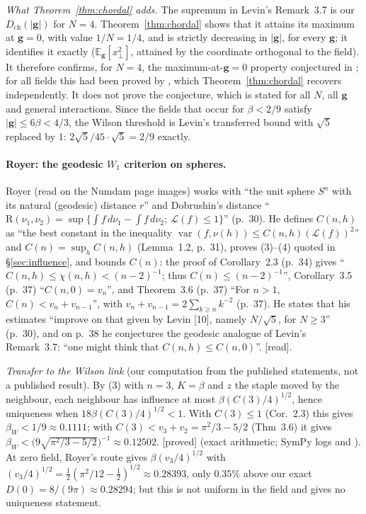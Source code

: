 \documentclass[11pt,a4paper]{article}
\theoremstyle{remark}
\theoremstyle{definition}
\theoremstyle{plain}
\theoremstyle{remark}
\newcommand{\E}{\mathbb{E}}
\newcommand{\st}[1]{\textsf{[#1]}}
\newcommand{\Dch}{D_{\mathrm{ch}}}
\begin{document}
\emph{What Theorem~\ref{thm:chordal} adds.} The supremum in Levin's Remark~3.7 is our $\Dch(|\mathbf g|)$ for $N=4$.
Theorem~\ref{thm:chordal} shows that it attains its maximum at $\mathbf g=0$, with value $1/N=1/4$, and is strictly decreasing in $|\mathbf g|$, for every $\mathbf g$; it identifies it exactly
($\E_{\mathbf g}[x_\perp^2]$, attained by the coordinate orthogonal to the field). It therefore confirms, for $N=4$, the
maximum-at-$\mathbf g=0$ property conjectured in \cite[Rem.~3.7]{Lev80}; for all fields this had been proved by \cite[Theorem~7]{BB26}, which Theorem~\ref{thm:chordal} recovers independently.
It does not prove the conjecture, which is stated for all $N$, all $\mathbf g$ and general interactions.
Since the fields that occur for $\beta<2/9$ satisfy $|\mathbf g|\le6\beta<4/3$, the Wilson threshold is
Levin's transferred bound with $\sqrt5$ replaced by $1$: $2\sqrt5/45\cdot\sqrt5=2/9$ exactly.

\paragraph{Royer: the geodesic $W_1$ criterion on spheres.} Royer \cite{Roy86} (read on the Numdam page
images) works with ``the unit sphere $S^n$ with its natural (geodesic) distance $r$'' and Dobrushin's
distance ``$\mathrm R(\nu_1,\nu_2)=\sup\{\int f\,d\nu_1-\int f\,d\nu_2;\ \mathscr L(f)\leqslant1\}$'' (p.~30).
He defines $C(n,h)$ as ``the best constant in the inequality $\operatorname{var}(f,\nu(h))\leqslant C(n,h)(\mathscr L(f))^2$''
and $C(n)=\sup_hC(n,h)$ (Lemma~1.2, p.~31), proves (3)--(4) quoted in \S\ref{sec:influence}, and bounds $C(n)$:
the proof of Corollary~2.3 (p.~34) gives ``$C(n,h)\leqslant\chi(n,h)<(n-2)^{-1}$; thus
$C(n)\leqslant(n-2)^{-1}$'', Corollary~3.5 (p.~37) ``$C(n,0)=v_n$'', and Theorem~3.6 (p.~37) ``For $n>1$,
$C(n)<v_n+v_{n-1}$'', with $v_n+v_{n-1}=2\sum_{k\geqslant n}k^{-2}$ (p.~37). He states that his estimates
``improve on that given by Levin [10], namely $N/\sqrt5$, for $N\geqslant3$'' (p.~30), and on p.~38 he conjectures
the geodesic analogue of Levin's Remark~3.7: ``one might think that $C(n,h)\leqslant C(n,0)$''. \st{read}.

\emph{Transfer to the Wilson link} (our computation from the published statements, not a published
result). By (3) with $n=3$, $K=\beta$ and $z$ the staple moved by the neighbour, each neighbour has influence
at most $\beta(C(3)/4)^{1/2}$, hence uniqueness when $18\beta(C(3)/4)^{1/2}<1$. With $C(3)\le1$ (Cor.~2.3) this
gives $\beta_W<1/9\approx0.1111$; with $C(3)<v_3+v_2=\pi^2/3-5/2$ (Thm~3.6) it gives
$\beta_W<\big(9\sqrt{\pi^2/3-5/2}\big)^{-1}\approx0.12502$. \st{proved} (exact arithmetic; SymPy logs
 and ). At zero field, Royer's route gives $\beta(v_3/4)^{1/2}$ with
$(v_3/4)^{1/2}=\tfrac12(\pi^2/12-\tfrac12)^{1/2}\approx0.28393$, only $0.35\%$ above our exact
$D(0)=8/(9\pi)\approx0.28294$; but this is not uniform in the field and gives no uniqueness statement.
\end{document}
